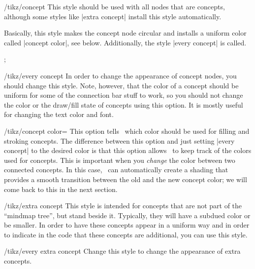 \begin{stylekey}{/tikz/concept}
    This style should be used with all nodes that are concepts, although some
    styles like |extra concept| install this style automatically.

    Basically, this style makes the concept node circular and installs a
    uniform color called |concept color|, see below. Additionally, the style
    |every concept| is called.
\begin{codeexample}[preamble={\usetikzlibrary{mindmap}}]
\tikz[mindmap,concept color=red!50] ;
\end{codeexample}

    \begin{stylekey}{/tikz/every concept}
        In order to change the appearance of concept nodes, you should change
        this style. Note, however, that the color of a concept should be
        uniform for some of the connection bar stuff to work, so you should not
        change the color or the draw/fill state of concepts using this option.
        It is mostly useful for changing the text color and font.
    \end{stylekey}

    \begin{key}{/tikz/concept color=}
        This option tells \tikzname\ which color should be used for filling and
        stroking concepts. The difference between this option and just setting
        |every concept| to the desired color is that this option allows
        \tikzname\ to keep track of the colors used for concepts. This is
        important when you \emph{change} the color between two connected
        concepts. In this case, \tikzname\ can automatically create a shading
        that provides a smooth transition between the old and the new concept
        color; we will come back to this in the next section.
    \end{key}
\end{stylekey}

\begin{stylekey}{/tikz/extra concept}
    This style is intended for concepts that are not part of the ``mindmap
    tree'', but stand beside it. Typically, they will have a subdued color or
    be smaller. In order to have these concepts appear in a uniform way and in
    order to indicate in the code that these concepts are additional, you can
    use this style.
\begin{codeexample}[preamble={\usetikzlibrary{mindmap}}]
\end{codeexample}
    \begin{stylekey}{/tikz/every extra concept}
        Change this style to change the appearance of extra concepts.
    \end{stylekey}
\end{stylekey}


